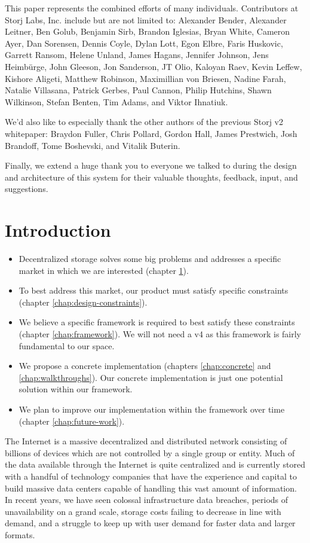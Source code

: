 \documentclass[11pt,fleqn,openany]{book}
\begin{document}
This paper represents the combined efforts of many individuals.
Contributors at Storj Labs, Inc. include but are not limited to:
Alexander Bender,
Alexander Leitner,
Ben Golub,
Benjamin Sirb,
Brandon Iglesias,
Bryan White,
Cameron Ayer,
Dan Sorensen,
Dennis Coyle,
Dylan Lott,
Egon Elbre,
Faris Huskovic,
Garrett Ransom,
Helene Unland,
James Hagans,
Jennifer Johnson,
Jens Heimbürge,
John Gleeson,
Jon Sanderson,
JT Olio,
Kaloyan Raev,
Kevin Leffew,
Kishore Aligeti,
Matthew Robinson,
Maximillian von Briesen,
Nadine Farah,
Natalie Villasana,
Patrick Gerbes,
Paul Cannon,
Philip Hutchins,
Shawn Wilkinson,
Stefan Benten,
Tim Adams,
and Viktor Ihnatiuk.

We'd also like to especially thank the other authors of the previous
Storj v2 whitepaper:
Braydon Fuller,
Chris Pollard,
Gordon Hall,
James Prestwich,
Josh Brandoff,
Tome Boshevski,
and Vitalik Buterin.

Finally, we extend a huge thank you to everyone we talked to during the
design and architecture of this system for their valuable thoughts, feedback,
input, and suggestions.

\chapter{Introduction}\label{chap:intro}

\begin{itemize}
\item Decentralized storage solves some big problems and
  addresses a specific market in which we are interested (chapter \ref{chap:intro}).
\item To best address this market, our product must satisfy specific constraints
  (chapter \ref{chap:design-constraints}).
\item We believe a specific framework is required to best satisfy these
  constraints (chapter \ref{chap:framework}).
  We will not need a v4 as this framework is fairly fundamental to our space.
\item We propose a concrete implementation (chapters \ref{chap:concrete} and
  \ref{chap:walkthroughs}).
  Our concrete implementation is just one potential solution within our
  framework.
\item We plan to improve our implementation within the framework over time
  (chapter \ref{chap:future-work}).
\end{itemize}

The Internet is a massive decentralized and distributed network consisting of
billions of devices which are not controlled by a single group or entity.
Much of the data available through the Internet is quite centralized and is currently stored with a handful of technology companies that have the
experience and capital to build massive data centers capable of handling this
vast amount of information.
In recent years, we have seen colossal infrastructure data breaches, periods of
unavailability on a grand scale, storage costs failing to decrease in line with
demand, and a struggle to keep up with user demand for faster data and larger
formats.
\end{document}
